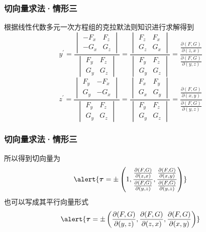 \begin{frame}
    \frametitle{切向量求法·情形三}

    根据线性代数多元一次方程组的克拉默法则知识进行求解得到\pause
    \begin{equation}
        y^\prime%
        =\frac{\begin{vmatrix}-F_x&F_z\\-G_x&G_z\end{vmatrix}}{\begin{vmatrix}F_y&F_z\\G_y&G_z\end{vmatrix}}%
        =\frac{\begin{vmatrix}F_z&F_x\\G_z&G_x\end{vmatrix}}{\begin{vmatrix}F_y&F_z\\G_y&G_z\end{vmatrix}}%
        =\frac{\frac{\partial(F,G)}{\partial(z,x)}}{\frac{\partial(F,G)}{\partial(y,z)}}%
        \label{eq:hid_eq_der_solve_y}
    \end{equation}\pause
    \begin{equation}
        z^\prime%
        =\frac{\begin{vmatrix}F_y&-F_x\\G_y&-G_x\end{vmatrix}}{\begin{vmatrix}F_y&F_z\\G_y&G_z\end{vmatrix}}%
        =\frac{\begin{vmatrix}F_x&F_y\\G_x&G_y\end{vmatrix}}{\begin{vmatrix}F_y&F_z\\G_y&G_z\end{vmatrix}}%
        =\frac{\frac{\partial(F,G)}{\partial(x,y)}}{\frac{\partial(F,G)}{\partial(y,z)}}%
        \label{eq:hid_eq_der_solve_z}
    \end{equation}

\end{frame}

\begin{frame}
    \frametitle{切向量求法·情形三}

    所以得到切向量为\pause
    \begin{equation}
        \alert{\boldsymbol{\tau}=\pm\left(1,\frac{\frac{\partial(F,G)}{\partial(z,x)}}{\frac{\partial(F,G)}{\partial(y,z)}},\frac{\frac{\partial(F,G)}{\partial(x,y)}}{\frac{\partial(F,G)}{\partial(y,z)}}\right)}%
        \label{eq:tangent_vec3a}
    \end{equation}\pause
    也可以写成其平行向量形式\pause
    \begin{equation}
        \alert{\boldsymbol{\tau}=\pm\left(\frac{\partial(F,G)}{\partial(y,z)},\frac{\partial(F,G)}{\partial(z,x)},\frac{\partial(F,G)}{\partial(x,y)}\right)}%
        \label{eq:tangent_vec3b}
    \end{equation}

\end{frame}

